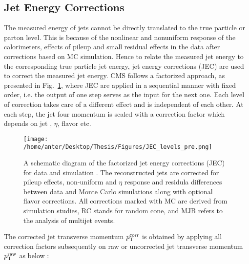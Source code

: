 \subsection{Jet Energy Corrections}
\label{sec:jet_corrections}
The measured energy of jets cannot be directly translated to the true particle or parton level. This is because of the
nonlinear and nonuniform response of the calorimeters, effects of pileup and small residual effects in the data after corrections based on MC simulation. Hence to relate the measured jet energy to the corresponding true particle jet energy, jet energy corrections (JEC) \cite{Chatrchyan:2011ds, Khachatryan:2016kdb} are used to correct the measured jet energy. CMS follows a factorized approach, as presented in Fig.~\ref{fig:jec}, where JEC are applied in a sequential manner with fixed order, i.e. the output of one step serves as the input for the next one. Each level of correction takes care of a different effect and is independent of each other. At each step, the jet four momentum is scaled with a correction factor which depends on jet \pt, $\eta$, flavor etc.

\begin{figure}[!h]
 \begin{center}
 \vspace*{4mm} 
 \texttt{[image: /home/anter/Desktop/Thesis/Figures/JEC\_levels\_pre.png]}\\
 \vspace*{5mm}
 \caption[Lumi]{A schematic diagram of the factorized jet energy corrections (JEC) for data and simulation \cite{Khachatryan:2016kdb}. The reconstructed jets are corrected for pileup effects, non-uniform \pt and $\eta$ response and residula differences between data and Monte Carlo simulations along with optional flavor corrections. All corrections marked with MC are derived from simulation studies, RC stands for random cone, and MJB refers to the analysis of multijet events.}
 \label{fig:jec}
 \end{center}
\end{figure}

The corrected jet transverse momentum $p^{\rm corr}_{\rm T}$ is obtained by applying all correction factors subsequently on raw or uncorrected jet transverse momentum $p^{\rm raw}_{\rm T}$ as below :

